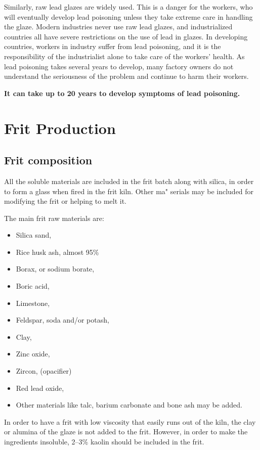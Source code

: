 Similarly, raw lead glazes are widely used. This is a danger for the workers, 
who will eventually develop lead poisoning unless they take extreme care in 
handling the glaze. Modern industries never use raw lead glazes, and 
industrialized countries all have severe restrictions on the use of lead in 
glazes. In developing countries, workers in industry suffer from lead 
poisoning, and it is the responsibility of the industrialist alone to take care 
of the workers' health. As lead poisoning takes several years to develop, many 
factory owners do not understand the seriousness of the problem and continue to 
harm their workers. 

\textbf{It can take up to 20 years to develop symptoms of lead poisoning.}
\section{Frit Production}
\subsection{Frit composition}
All the soluble materials are included in the frit batch along with silica, in 
order to form a glass when fired in the frit kiln. Other ma" serials may be 
included for modifying the frit or helping to melt it.

The main frit raw materials are:
\begin{itemize}
\item Silica sand, 
\item Rice husk ash, almost 95\% 
\item Borax, or sodium borate, 
\item Boric acid, 
\item Limestone, 
\item Feldspar, soda and/or potash, 
\item Clay, 
\item Zinc oxide, 
\item Zircon,  (opacifier)
\item Red lead oxide, 
\item Other materials like talc, barium carbonate and bone ash may be added.
\end{itemize}
In order to have a frit with low viscosity that easily runs out of the kiln, 
the clay or alumina of the glaze is not added to the frit. However, in order to 
make the ingredients insoluble, 2--3\% kaolin should be included in the frit.
